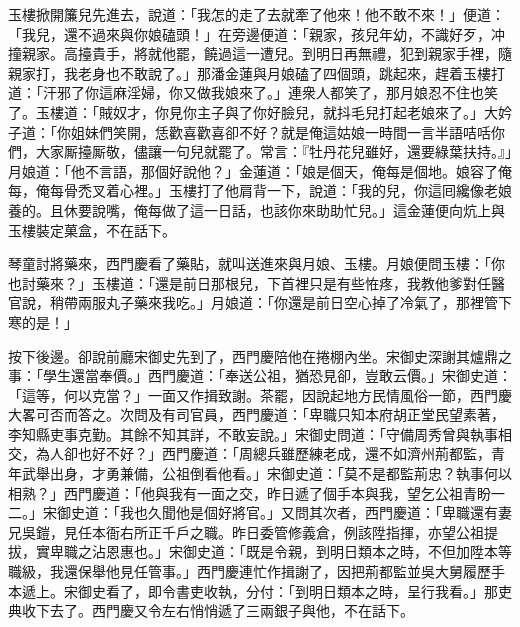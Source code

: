 玉樓掀開簾兒先進去，說道：「我怎的走了去就牽了他來！他不敢不來！」{}便道：「我兒，還不過來與你娘磕頭！」在旁邊便道：「親家，孩兒年幼，不識好歹，冲撞親家。高擡貴手，將就他罷，饒過這一遭兒。到明日再無禮，{}犯到親家手裡，隨親家打，我老身也不敢說了。」{}那潘金蓮與月娘磕了四個頭，跳起來，趕着玉樓打道：「汗邪了你這麻淫婦，你又做我娘來了。」連衆人都笑了，那月娘忍不住也笑了。{}玉樓道：「賊奴才，你見你主子與了你好臉兒，就抖毛兒打起老娘來了。」大妗子道：「你姐妹們笑開，恁歡喜歡喜卻不好？就是俺這姑娘一時間一言半語咭咶你們，大家厮擡厮敬，儘讓一句兒就罷了。常言：『牡丹花兒雖好，還要綠葉扶持。』」月娘道：「他不言語，那個好說他？」金蓮道：「娘是個天，俺每是個地。娘容了俺每，俺每骨禿叉着心裡。」玉樓打了他肩背一下，說道：「我的兒，你這囘纔像老娘養的。且休要說嘴，俺每做了這一日話，也該你來助助忙兒。」這金蓮便向炕上與玉樓裝定菓盒，不在話下。

琴童討將藥來，西門慶看了藥貼，就叫送進來與月娘、玉樓。月娘便問玉樓：「你也討藥來？」玉樓道：「還是前日那根兒，下首裡只是有些恠疼，我教他爹對任醫官說，稍帶兩服丸子藥來我吃。」月娘道：「你還是前日空心掉了冷氣了，那裡管下寒的是！」

按下後邊。卻說前廳宋御史先到了，西門慶陪他在捲棚內坐。宋御史深謝其爐鼎之事：「學生還當奉價。」西門慶道：「奉送公祖，猶恐見卻，豈敢云價。」宋御史道：「這等，何以克當？」一面又作揖致謝。茶罷，因說起地方民情風俗一節，西門慶大畧可否而答之。次問及有司官員，{}西門慶道：「卑職只知本府胡正堂民望素著，李知縣吏事克勤。其餘不知其詳，不敢妄說。」宋御史問道：「守備周秀曾與執事相交，為人卻也好不好？」西門慶道：「周總兵雖歷練老成，還不如濟州荊都監，青年武舉出身，才勇兼備，公祖倒看他看。」宋御史道：「莫不是都監荊忠？執事何以相熟？」西門慶道：「他與我有一面之交，昨日遞了個手本與我，望乞公祖青盼一二。」宋御史道：「我也久聞他是個好將官。」又問其次者，西門慶道：「卑職還有妻兄吳鎧，見任本衙右所正千戶之職。昨日委管修義倉，例該陞指揮，亦望公祖提拔，實卑職之沾恩惠也。」宋御史道：「既是令親，到明日類本之時，不但加陞本等職級，我還保舉他見任管事。」西門慶連忙作揖謝了，因把荊都監並吳大舅履歷手本遞上。宋御史看了，即令書吏收執，分付：「到明日類本之時，呈行我看。」那吏典收下去了。西門慶又令左右悄悄遞了三兩銀子與他，不在話下。

